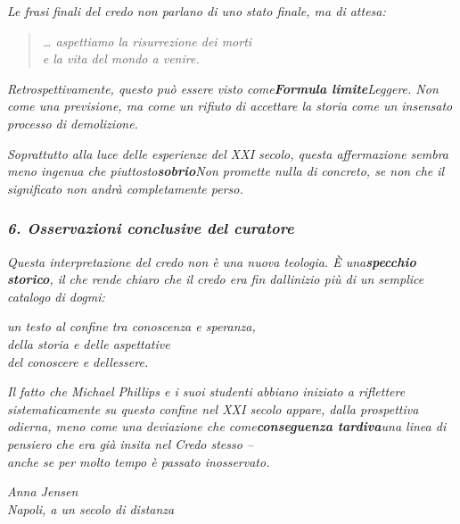 \documentclass[
]{article}
\begin{document}
\emph{Le frasi finali del credo non parlano di uno stato finale, ma di attesa:}

\begin{quote}
\emph{\ldots{} aspettiamo la risurrezione dei morti\\
e la vita del mondo a venire.}
\end{quote}

\emph{Retrospettivamente, questo può essere visto come\textbf{Formula limite}Leggere. Non come una previsione, ma come un rifiuto di accettare la storia come un insensato processo di demolizione.}

\emph{Soprattutto alla luce delle esperienze del XXI secolo, questa affermazione sembra meno ingenua che piuttosto\textbf{sobrio}Non promette nulla di concreto, se non che il significato non andrà completamente perso.}

\subsubsection{\texorpdfstring{\emph{\textbf{6. Osservazioni conclusive del curatore}}}{6. Osservazioni conclusive del curatore}}\label{osservazioni-conclusive-del-curatore}

\emph{Questa interpretazione del credo non è una nuova teologia. È una\textbf{specchio storico}, il che rende chiaro che il credo era fin dall\textquotesingle inizio più di un semplice catalogo di dogmi:}

\emph{un testo al confine tra conoscenza e speranza,\\
della storia e delle aspettative\\
del conoscere e dell\textquotesingle essere.}

\emph{Il fatto che Michael Phillips e i suoi studenti abbiano iniziato a riflettere sistematicamente su questo confine nel XXI secolo appare, dalla prospettiva odierna, meno come una deviazione che come\textbf{conseguenza tardiva}una linea di pensiero che era già insita nel Credo stesso --\\
anche se per molto tempo è passato inosservato.}

\emph{Anna Jensen\\
Napoli, a un secolo di distanza}
\end{document}
